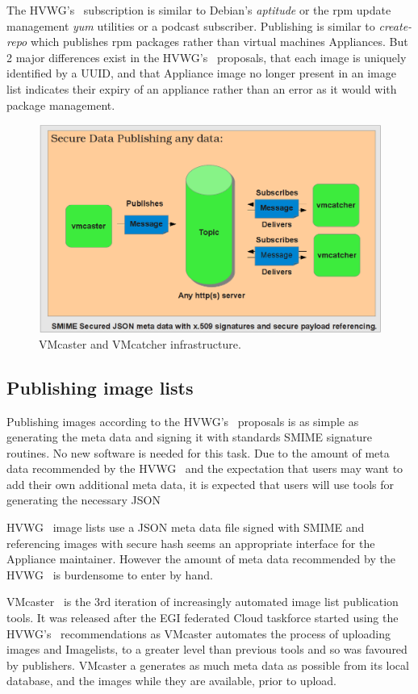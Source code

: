 \documentclass[oribibl]{llncs}
\begin{document}
The HVWG's~\cite{hepix} subscription is similar to Debian's \textit{aptitude} or the rpm update management \textit{yum} utilities or a podcast subscriber. Publishing is similar to \textit{create-repo} which publishes rpm packages rather than virtual machines Appliances. But 2 major differences exist in the HVWG's~\cite{hepix} proposals, that each image is uniquely identified by a UUID, and that Appliance image no longer present in an image list indicates their expiry of an appliance rather than an error as it would with package management.
\begin{figure}[h]
\centering
\includegraphics[width=1\textwidth]{vmcaster_vmcatcher.png}
\caption{VMcaster and VMcatcher infrastructure.}
\label{fig:infrastructure}
\end{figure}

\subsection{Publishing image lists}
Publishing images according to the HVWG's~\cite{hepix} proposals is as simple as generating the meta data and signing it with standards SMIME signature routines. No new software is needed for this task. Due to the amount of meta data recommended by the HVWG~\cite{hepix} and the expectation that users may want to add their own additional meta data, it is expected that users will use tools for generating the necessary JSON 

HVWG~\cite{hepix} image lists use a JSON meta data file signed with SMIME and referencing images with secure hash seems an appropriate interface for the Appliance maintainer. However the amount of meta data recommended by the HVWG~\cite{hepix} is burdensome to enter by hand.
 
VMcaster~\cite{vmcaster} is the 3rd iteration of increasingly automated image list publication tools. It was released after the EGI federated Cloud taskforce started using the HVWG's~\cite{hepix} recommendations as VMcaster automates the process of uploading images and Imagelists, to a greater level than previous tools and so was favoured by publishers. VMcaster a generates as much meta data as possible from its local database, and the images while they are available, prior to upload.
\end{document}
